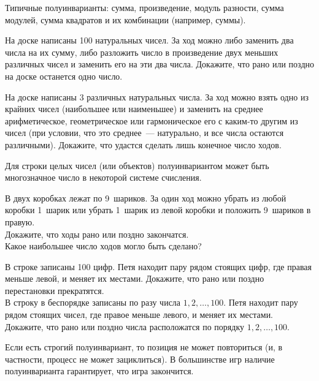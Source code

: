 Типичные полуинварианты: сумма, произведение, модуль разности, сумма модулей,
сумма квадратов и их комбинации (например, суммы).

\begin{problems}

\item
На доске написаны 100 натуральных чисел.
За ход можно либо заменить два числа на их сумму, либо разложить число
в произведение двух меньших различных чисел и заменить его на эти два числа.
Докажите, что рано или поздно на доске останется одно число.

\item
На доске написаны 3 различных натуральных числа.
За ход можно взять одно из крайних чисел (наибольшее или наименьшее) и заменить
на среднее арифметическое, геометрическое или гармоническое его с каким-то
другим из чисел (при условии, что это среднее~— натурально, и все числа
остаются различными).
Докажите, что удастся сделать лишь конечное число ходов.

\end{problems}

Для строки целых чисел (или объектов) полуинвариантом может быть многозначное
число в некоторой системе счисления.

\begin{problems}

\item
В двух коробках лежат по 9~шариков.
За один ход можно убрать из любой коробки 1~шарик или убрать 1~шарик из левой
коробки и положить 9~шариков в правую.
\\
\subproblem
Докажите, что ходы рано или поздно закончатся.
\\
\subproblem
Какое наибольшее число ходов могло быть сделано?

\item
\subproblem
В строке записаны 100 цифр.
Петя находит пару рядом стоящих цифр, где правая меньше левой, и меняет
их местами.
Докажите, что рано или поздно перестановки прекратятся.
\\
\subproblem
В строку в беспорядке записаны по разу числа $1, 2, \ldots, 100$.
Петя находит пару рядом стоящих чисел, где правое меньше левого, и меняет
их местами.
Докажите, что рано или поздно числа расположатся по порядку
$1, 2, \ldots, 100$.

\end{problems}

Если есть строгий полуинвариант, то позиция не может повториться
(и, в частности, процесс не может зациклиться).
В большинстве игр наличие полуинварианта гарантирует, что игра закончится.

